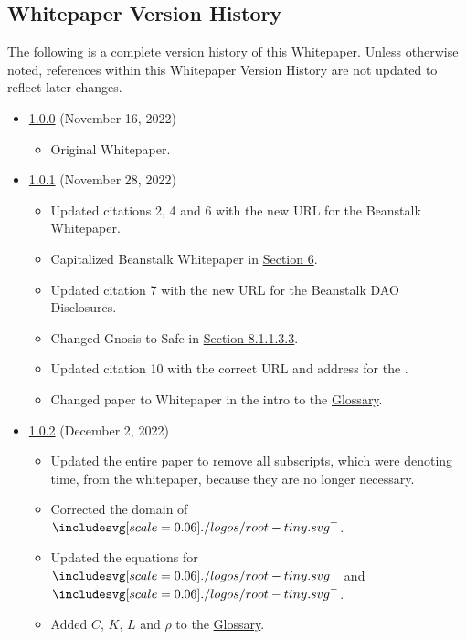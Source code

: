 \documentclass[class=article, crop=false]{standalone}
\begin{document}
\subsection{Whitepaper Version History}
The following is a complete version history of this Whitepaper. Unless otherwise noted, references within this Whitepaper Version History are not updated to reflect later changes.

\begin{itemize}[topsep=0pt, itemsep=3pt,leftmargin=16pt]
    \item \href{https://github.com/RootToken/Root-Whitepaper/blob/master/version-history/root1_0_0.pdf}{1.0.0} (November 16, 2022)
    \begin{itemize}
        \item Original Whitepaper.
    \end{itemize}
    \item \href{https://github.com/RootToken/Root-Whitepaper/blob/master/version-history/root1_0_1.pdf}{1.0.1} (November 28, 2022)
    \begin{itemize}
        \item Updated citations 2, 4 and 6 with the new URL for the Beanstalk Whitepaper.
        \item Capitalized Beanstalk Whitepaper in \hyperlink{section.6}{Section 6}.
        \item Updated citation 7 with the new URL for the Beanstalk DAO Disclosures.
        \item Changed Gnosis to Safe in \hyperlink{subparagraph.8.1.1.3.3}{Section 8.1.1.3.3}.
        \item Updated citation 10 with the correct URL and address for the .
        \item Changed paper to Whitepaper in the intro to the \hyperlink{subsection.8.2}{Glossary}.
    \end{itemize}
    \item \href{https://github.com/RootToken/Root-Whitepaper/blob/master/version-history/root1_0_2.pdf}{1.0.2} (December 2, 2022)
    \begin{itemize}
        \item Updated the entire paper to remove all subscripts, which were denoting time, from the whitepaper, because they are no longer necessary.
        \item Corrected the domain of $\Root^{+}$.
        \item Updated the equations for $\Root^{+}$ and $\Root^{-}$.
        \item Added $C$, $K$, $L$ and $\rho$ to the \hyperlink{subsection.8.3}{Glossary}. 

\end{itemize}
\end{itemize}
\end{document}
